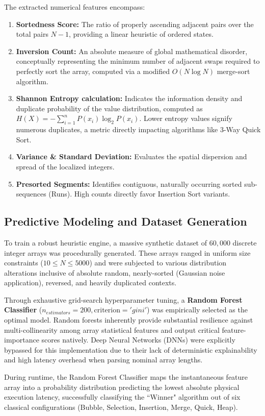 \documentclass[conference]{IEEEtran}
\begin{document}
The extracted numerical features encompass:
\begin{enumerate}
\item \textbf{Sortedness Score:} The ratio of properly ascending adjacent pairs over the total pairs $N-1$, providing a linear heuristic of ordered states.
\item \textbf{Inversion Count:} An absolute measure of global mathematical disorder, conceptually representing the minimum number of adjacent swaps required to perfectly sort the array, computed via a modified $O(N \log N)$ merge-sort algorithm.
\item \textbf{Shannon Entropy calculation:} Indicates the information density and duplicate probability of the value distribution, computed as $H(X) = -\sum_{i=1}^{n} P(x_i) \log_2 P(x_i)$. Lower entropy values signify numerous duplicates, a metric directly impacting algorithms like 3-Way Quick Sort.
\item \textbf{Variance \& Standard Deviation:} Evaluates the spatial dispersion and spread of the localized integers.
\item \textbf{Presorted Segments:} Identifies contiguous, naturally occurring sorted sub-sequences (Runs). High counts directly favor Insertion Sort variants.
\end{enumerate}

\subsection{Predictive Modeling and Dataset Generation}
To train a robust heuristic engine, a massive synthetic dataset of $60,000$ discrete integer arrays was procedurally generated. These arrays ranged in uniform size constraints ($10 \leq N \leq 5000$) and were subjected to various distribution alterations inclusive of absolute random, nearly-sorted (Gaussian noise application), reversed, and heavily duplicated contexts. 

Through exhaustive grid-search hyperparameter tuning, a \textbf{Random Forest Classifier} ($n_{estimators}=200, \text{criterion}='gini'$) was empirically selected as the optimal model. Random forests inherently provide substantial resilience against multi-collinearity among array statistical features and output critical feature-importance scores natively. Deep Neural Networks (DNNs) were explicitly bypassed for this implementation due to their lack of deterministic explainability and high latency overhead when parsing nominal array lengths. 

During runtime, the Random Forest Classifier maps the instantaneous feature array into a probability distribution predicting the lowest absolute physical execution latency, successfully classifying the ``Winner" algorithm out of six classical configurations (Bubble, Selection, Insertion, Merge, Quick, Heap).
\end{document}
